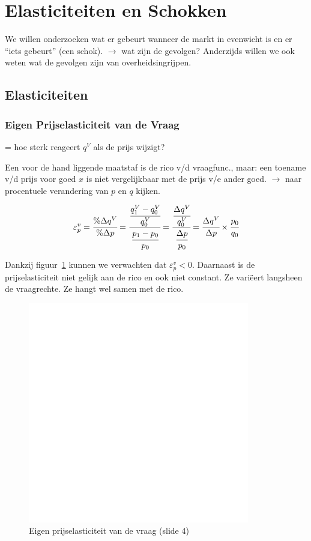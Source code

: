 \section{Elasticiteiten en Schokken}
We willen onderzoeken wat er gebeurt wanneer de markt in evenwicht is en er ``iets gebeurt'' (een schok). $\rightarrow$ wat zijn de gevolgen? Anderzijds willen we ook weten wat de gevolgen zijn van overheidsingrijpen.

\subsection{Elasticiteiten}
\subsubsection{Eigen Prijselasticiteit van de Vraag}
\label{sssec:PrijselastVanDeVraag}

= hoe sterk reageert $q^V$ als de prijs wijzigt?

Een voor de hand liggende maatstaf is de rico v/d vraagfunc., maar: een toename v/d prijs voor goed $x$ is niet vergelijkbaar met de prijs v/e ander goed. $\rightarrow$ naar procentuele verandering van $p$ en $q$ kijken.

\begin{equation}
	\varepsilon^{v}_{p} =
    \cfrac{\% \Delta q^V}{\% \Delta p} =
    \cfrac{\cfrac{q^{V}_{1} - q^{V}_{0}}{q_{0}^{V}}}{\cfrac{p_1 - p_0}{p_0}} =
    \cfrac{\cfrac{\Delta q^V}{q_{0}^{V}}}{\cfrac{\Delta p}{p_0}} =
    \cfrac{\Delta q^V}{\Delta p} \times \cfrac{p_0}{q_0}
    \label{eq:prijselasticiteitvandevraag}
\end{equation}


Dankzij figuur~\ref{fig:eigenPrijselasticiteitVanDeVraag} kunnen we verwachten dat $\varepsilon^{v}_{p} < 0$. Daarnaast is de prijselasticiteit niet gelijk aan de rico en ook niet constant. Ze vari\"{e}ert langsheen de vraagrechte. Ze hangt wel samen met de rico.
\begin{figure}[htbp]
	\centering
	\includegraphics[scale=0.4]{Images/white.png}
	\caption{Eigen prijselasticiteit van de vraag (slide 4)}
	\label{fig:eigenPrijselasticiteitVanDeVraag}
\end{figure}


